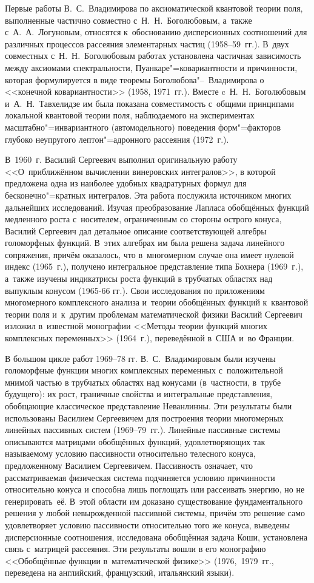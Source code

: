 Первые работы В.~С.~Владимирова по аксиоматической квантовой теории поля, выполненные частично совместно с~Н.~Н.~Боголюбовым, а~также с~А.~А.~Логуновым, относятся к~обоснованию дисперсионных соотношений для различных процессов рассеяния элементарных частиц (1958--59~гг.).
В~двух совместных с~Н.~Н.~Боголюбовым работах установлена частичная зависимость между аксиомами спектральности, Пуанкаре"=ковариантности и причинности, которая формулируется в виде теоремы Боголюбова"--~Владимирова о <<конечной ковариантности>> (1958, 1971~гг.). Вместе c~Н.~Н.~Боголюбовым и~А.~Н.~Тавхелидзе им была показана совместимость с~общими принципами локальной квантовой теории поля, наблюдаемого на экспериментах масштабно"=инвариантного (автомодельного) поведения форм"=факторов глубоко неупругого лептон"=адронного рассеяния (1972~г.).


В~1960~г. Василий Сергеевич выполнил оригинальную работу <<О~приближённом вычислении винеровских интегралов>>, в которой предложена одна из наиболее удобных квадратурных формул для бесконечно"=кратных интегралов. Эта работа послужила источником многих дальнейших исследований.
Изучая преобразование Лапласа обобщённых функций медленного роста с~носителем, ограниченным со стороны острого конуса, Василий Сергеевич дал детальное описание соответствующей алгебры голоморфных функций. 
В~этих алгебрах им была решена задача линейного сопряжения, причём оказалось, что в~многомерном случае она имеет нулевой индекс (1965~г.), получено интегральное представление типа Бохнера (1969~г.), а~также изучены индикатрисы роста функций в трубчатых областях над выпуклым конусом (1965-66 гг.). 
Свои исследования по приложениям многомерного комплексного анализа и~теории обобщённых функций к~квантовой теории поля и~к~другим проблемам математической физики Василий Сергеевич изложил в~известной монографии <<Методы теории функций многих комплексных переменных>> (1964~г.), переведённой в~США и~во Франции.


В большом цикле работ 1969--78 гг. В.~С.~Владимировым были изучены голоморфные функции многих комплексных переменных с~положительной мнимой частью в трубчатых областях над конусами (в~частности, в~трубе будущего): их рост, граничные свойства и интегральные представления, обобщающие классическое представление Неванлинны. 
Эти результаты были использованы Василием Сергеевичем для построения теории многомерных линейных пассивных систем (1969--79~гг.). 
Линейные пассивные системы описываются матрицами обобщённых функций, удовлетворяющих так называемому условию пассивности относительно телесного конуса, предложенному Василием Сергеевичем. 
Пассивность означает, что рассматриваемая физическая система подчиняется условию причинности относительно конуса и способна лишь поглощать или рассеивать энергию, но не генерировать~её. 
В~этой области им доказано существование фундаментального решения у любой невырожденной пассивной системы, причём это решение само удовлетворяет условию пассивности относительно того же конуса, выведены дисперсионные соотношения, исследована обобщённая задача Коши, установлена связь с~матрицей рассеяния. 
Эти результаты вошли в его монографию <<Обобщённые функции в~математической физике>> (1976,~1979~гг., переведена на английский, французский, итальянский языки).


